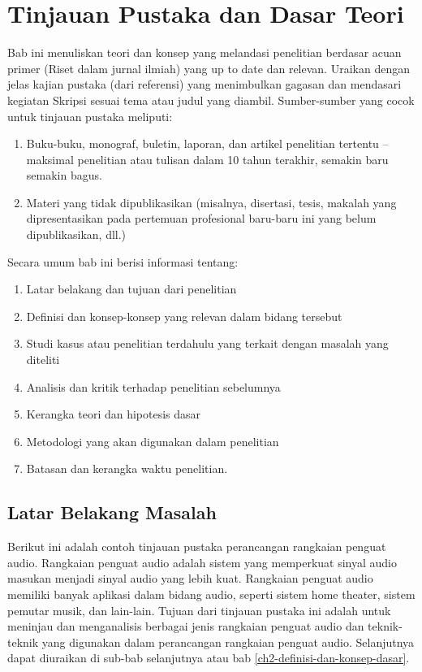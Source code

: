 \chapter{Tinjauan Pustaka dan Dasar Teori}

Bab ini menuliskan teori dan konsep yang melandasi penelitian berdasar acuan primer (Riset dalam jurnal ilmiah) yang up to date dan relevan. Uraikan dengan jelas kajian pustaka 
(dari referensi) yang menimbulkan gagasan dan mendasari kegiatan Skripsi sesuai tema atau judul yang diambil. Sumber-sumber yang cocok untuk tinjauan pustaka meliputi:

\begin{enumerate}
\item Buku-buku, monograf, buletin, laporan, dan artikel penelitian tertentu – maksimal 
penelitian atau tulisan dalam 10 tahun terakhir, semakin baru semakin bagus.
\item Materi yang tidak dipublikasikan (misalnya, disertasi, tesis, makalah yang 
dipresentasikan pada pertemuan profesional baru-baru ini yang belum dipublikasikan, 
dll.)
\end{enumerate}

\noindent Secara umum bab ini berisi informasi tentang:

\begin{enumerate}
\item Latar belakang dan tujuan dari penelitian
\item Definisi dan konsep-konsep yang relevan dalam bidang tersebut
\item Studi kasus atau penelitian terdahulu yang terkait dengan masalah yang diteliti
\item Analisis dan kritik terhadap penelitian sebelumnya
\item Kerangka teori dan hipotesis dasar
\item Metodologi yang akan digunakan dalam penelitian
\item Batasan dan kerangka waktu penelitian.
\end{enumerate}

\section{Latar Belakang Masalah}

Berikut ini adalah contoh tinjauan pustaka perancangan rangkaian penguat audio. Rangkaian penguat audio adalah sistem yang memperkuat sinyal audio masukan menjadi sinyal 
audio yang lebih kuat. Rangkaian penguat audio memiliki banyak aplikasi dalam bidang audio, seperti sistem home theater, sistem pemutar musik, dan lain-lain. Tujuan dari tinjauan pustaka ini adalah untuk meninjau dan menganalisis
berbagai jenis rangkaian penguat audio dan teknik-teknik
yang digunakan dalam perancangan rangkaian penguat audio. Selanjutnya dapat diuraikan di sub-bab selanjutnya atau bab \ref{ch2-definisi-dan-konsep-dasar}. 


